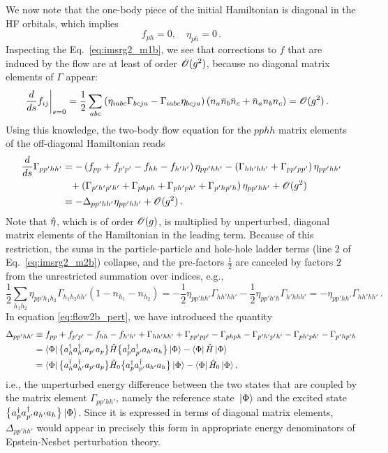 We now note that the one-body piece of the initial Hamiltonian is diagonal in 
the HF orbitals, which implies
\begin{equation}
  f_{ph}=0,\quad \eta_{ph}=0\,.
\end{equation} 
Inspecting the Eq.~\eqref{eq:imsrg2_m1b}, we see that corrections 
to $f$ that are induced by the flow are at least of order $\mathcal{O}(g^2)$, 
because no diagonal matrix elements of $\Gamma$ appear:
\begin{align}
  \left.\totd{}{s}f_{ij}\right|_{s=0} &=
    \frac{1}{2}\sum_{abc}
    \left(\eta_{iabc}\Gamma_{bcja}-\Gamma_{iabc}\eta_{bcja}\right)\left(n_{a}\bar{n}_{b}\bar{n}_{c}+\bar{n}_{a}n_{b}n_{c}\right)=\OC(g^2)\,.\label{eq:flow1b_pert}
\end{align}
Using this knowledge, the two-body flow equation for the $pphh$ matrix elements 
of the off-diagonal Hamiltonian reads
\begin{align}
  \totd{}{s}\Gamma_{pp'hh'}&=  
  -\left(f_{pp}+f_{p'p'}-f_{hh}-f_{h'h'}\right)\eta_{pp'hh'}
  -\left(\Gamma_{hh'hh'}+\Gamma_{pp'pp'}\right)\eta_{pp'hh'}
  \notag\\
  &\hphantom{=}
    +\left(\Gamma_{p'h'p'h'}+\Gamma_{phph}+\Gamma_{ph'ph'}+\Gamma_{p'hp'h}
     \right)\eta_{pp'hh'} + \OC(g^2)
  \notag\\
  &=-\Delta_{pp'hh'}\eta_{pp'hh'} + \OC(g^2)\,.\label{eq:flow2b_pert}
\end{align}
Note that $\hat{\eta}$, which is of order $\mathcal{O}(g)$, is multiplied
by unperturbed, diagonal matrix elements of the Hamiltonian 
in the leading term. Because of this restriction, the sums
in the particle-particle and hole-hole ladder terms (line 2 of Eq.~\eqref{eq:imsrg2_m2b})
collapse, and the pre-factors $\tfrac{1}{2}$ are canceled by 
factors $2$ from the unrestricted summation over indices, e.g.,
\begin{equation}
  \frac{1}{2}\sum_{h_1h_2}\eta_{pp'h_1h_2}\Gamma_{h_1h_2hh'}(1-n_{h_1}-n_{h_2})
  =-\frac{1}{2}\eta_{pp'hh'}\Gamma_{hh'hh'}-\frac{1}{2}\eta_{pp'h'h}\Gamma_{h'hhh'}
  =-\eta_{pp'hh'}\Gamma_{hh'hh'}\,.
\end{equation}
In equation \eqref{eq:flow2b_pert}, we have introduced the quantity 
\begin{align}
  \Delta_{pp'hh'}&\equiv
    f_{pp}+f_{p'p'}-f_{hh}-f_{h'h'} + \Gamma_{hh'hh'}+\Gamma_{pp'pp'}
    -\Gamma_{phph}-\Gamma_{p'h'p'h'}-\Gamma_{ph'ph'}-\Gamma_{p'hp'h} \notag\\
    &=\dmatrixe{\Phi}{\nord{\aaO_{h}\aaO_{h'}\aO_{p'}\aO_{p}}\HO\nord{\aaO_{p}\aaO_{p'}\aO_{h'}\aO_{h}}}-\dmatrixe{\Phi}{\HO}\notag\\
    &=\dmatrixe{\Phi}{\nord{\aaO_{h}\aaO_{h'}\aO_{p'}\aO_{p}}\HO_0\nord{\aaO_{p}\aaO_{p'}\aO_{h'}\aO_{h}}}-\dmatrixe{\Phi}{\HO_0}\,,
    \label{eq:def_epsteinnesbet_2b}
\end{align}
i.e., the unperturbed energy difference between the two states
that are coupled by the matrix element $\Gamma_{pp'hh'}$, namely
the reference state $\,|{\Phi}\rangle$ and the excited state $\big\{a^\dag_{p}a^\dag_{p'}a_{h'}a_{h}\big\}\,|{\Phi}\rangle$.
Since it is expressed in terms of diagonal matrix elements, $\Delta_{pp'hh'}$
would appear in precisely this form in appropriate energy denominators
of Epstein-Nesbet perturbation theory. 

